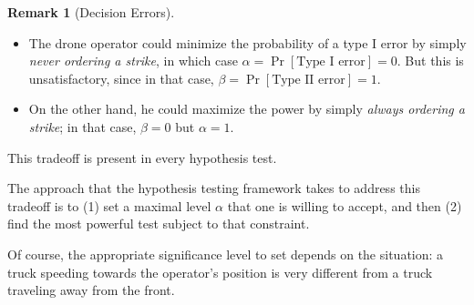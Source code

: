 \documentclass[10pt]{article}
\theoremstyle{definition}
\newtheorem{remark}[theorem]{Remark}
\newcommand{\1}[1]{\textbf{1}_{\left[#1\right]}} %
\def\P{\mathbb{P}} %
\begin{document}
\begin{remark}[Decision Errors]
  \begin{itemize}
    \item The drone operator could minimize the probability of a type I error
    by simply \textit{never ordering a strike}, in which case
    $\alpha= \Pr\left[ \text{Type I error} \right] = 0$. But this is
    unsatisfactory, since in that case,
    $\beta= \Pr\left[\text{Type II error} \right]=1$.
    \item On the other hand, he could maximize the power by simply \textit{always
      ordering a strike}; in that case, $\beta=0$ but $\alpha=1$.
  \end{itemize}
  This tradeoff is present in every hypothesis test.

  The approach that the hypothesis testing framework takes to address this
  tradeoff is to (1) set a maximal level $\alpha$ that one is willing to
  accept, and then (2) find the most powerful test subject to that constraint.

  Of course, the appropriate significance level to set depends on the
  situation: a truck speeding towards the operator's position is very
  different from a truck traveling away from the front.
\end{remark}

\end{document}
